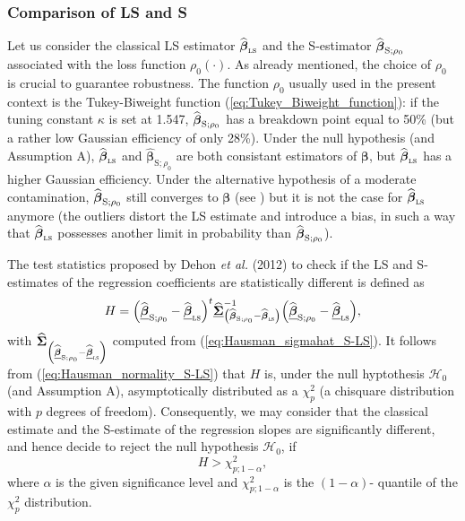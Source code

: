 \subsubsection{Comparison of LS and S}

Let us consider the classical LS estimator $\sthat{\boldsymbol\beta%
}_{\stsc{LS}}$ and the S-estimator $\sthat{\boldsymbol\beta}%
_{\mathrm{S};\rho_{0}}$ associated with the loss function $\rho_{0}\left(
\cdot\right)  $. As already mentioned, the choice of $\rho_{0}$ is crucial to
guarantee robustness. The function $\rho_{0}$ usually used in the present
context is the Tukey-Biweight function (\ref{eq:Tukey_Biweight_function}): if
the tuning constant $\kappa$ is set at 1.547, $\sthat{\boldsymbol\beta%
}_{\mathrm{S};\rho_{0}}$ has a breakdown point equal to 50\% (but a rather low
Gaussian efficiency of only 28\%). Under the null hypothesis (and Assumption
A), $\sthat{\boldsymbol\beta}_{\stsc{LS}}$ and $\widehat
{\boldsymbol\beta}_{\mathrm{S};\rho_{0}}$ are both consistant estimators of
$\boldsymbol\beta$, but $\sthat{\boldsymbol\beta}_{\stsc{LS}}$ has a
higher Gaussian efficiency. Under the alternative hypothesis of a moderate
contamination, $\widehat{\boldsymbol\beta}_{\mathrm{S};\rho_{0}}$ still
converges to $\boldsymbol\beta$ (see \citealp{Omelka:2010})
but it is not the case for $\sthat{\boldsymbol\beta}_{\stsc{LS}}$
anymore (the outliers distort the LS estimate and introduce a bias, in such a
way that $\sthat{\boldsymbol\beta}_{\stsc{LS}}$ possesses another limit
in probability than $\widehat{\boldsymbol\beta}_{\mathrm{S};\rho_{0}}$).

The test statistics proposed by Dehon \textit{et al.} (2012) to check if the
LS and S-estimates of the regression coefficients are statistically different
is defined as
\begin{equation}
H=\left(  \sthat{\underline{\boldsymbol\beta}}_{\mathrm{S};\rho_{0}%
}-\sthat{\underline{\boldsymbol\beta}}_{\stsc{LS}}\right)  ^{t}%
\sthat{\underline{\boldsymbol{\Sigma}}}_{\left(  \sthat{\boldsymbol{\beta
}}_{\mathrm{S};\rho_{0}}-\sthat{\boldsymbol\beta}_{\stsc{LS}}\right)
}^{-1}\left(  \sthat{\underline{\boldsymbol\beta}}_{\mathrm{S};\rho_{0}%
}-\sthat{\underline{\boldsymbol\beta}}_{\stsc{LS}}\right)  ,
\label{Hausman_SvsLS}%
\end{equation}
with $\sthat{\boldsymbol{\Sigma}}_{\left(  \sthat{\underline
{\boldsymbol\beta}}_{\mathrm{S};\rho_{0}}-\sthat{\underline
{\boldsymbol\beta}}_{\stsc{LS}}\right)  }$ computed from
(\ref{eq:Hausman_sigmahat_S-LS}). It follows from
(\ref{eq:Hausman_normality_S-LS}) that $H$ is, under the null hyptothesis
$\mathcal{H}_{0}$ (and Assumption A), asymptotically distributed as a
$\chi_{p}^{2}$ (a chisquare distribution with $p$ degrees of freedom).
Consequently, we may consider that the classical estimate and the S-estimate
of the regression slopes are significantly different, and hence decide to
reject the null hypothesis $\mathcal{H}_{0}$, if
\[
H>\chi_{p;1-\alpha}^{2},
\]
where $\alpha$ is the given significance level and $\chi_{p;1-\alpha}^{2}$ is
the $\left(  1-\alpha\right)  $- quantile of the $\chi_{p}^{2}$ distribution.

